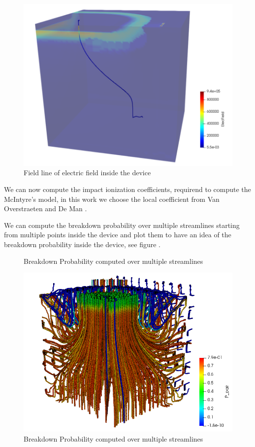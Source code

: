 \documentclass[10pt,a4paper,twocolumn]{article}
\begin{document}
\begin{figure}[h]
\centering
\includegraphics[scale=0.4]{../pictures/SL1.png}
\caption{Field line of electric field inside the device}
\label{fig:streamline1}
\end{figure}



We can now compute the impact ionization coefficients, requirend to compute the McIntyre's model, in this work we choose the local coefficient from Van Overstraeten and De Man \cite{van_overstraeten_measurement_1970}.

We can compute the breakdown probability over multiple streamlines starting from multiple points inside the device and plot them to have an idea of the breakdown probability inside the device, see figure .

\begin{figure}[hbtp]
\caption{Breakdown Probability computed over multiple streamlines}
\centering
\includegraphics[scale=0.50]{../pictures/MultipleStreamlinesBrP.png}
\caption{Breakdown Probability computed over multiple streamlines}
\end{figure}
\end{document}
